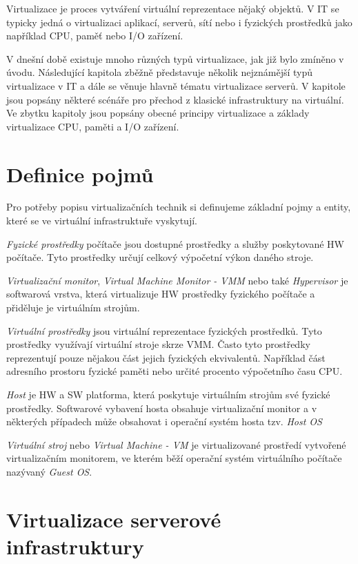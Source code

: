 Virtualizace je proces vytváření virtuální reprezentace nějaký objektů. V IT se typicky jedná o virtualizaci aplikací, serverů, sítí nebo i fyzických prostředků jako například CPU, paměť nebo I/O zařízení.

V dnešní době existuje mnoho různých typů virtualizace, jak již bylo zmíněno v úvodu. Následující kapitola zběžně představuje několik nejznámější typů virtualizace v IT a dále se věnuje hlavně
tématu virtualizace serverů. V kapitole jsou popsány některé scénáře pro přechod z klasické infrastruktury na virtuální. Ve zbytku kapitoly jsou popsány obecné principy virtualizace a základy 
virtualizace CPU, paměti a I/O zařízení.

\section{Definice pojmů}
\label{definitions}

Pro potřeby popisu virtualizačních technik si definujeme základní pojmy a entity, které se ve virtuální infrastruktuře vyskytují.

\textit{Fyzické prostředky} počítače jsou dostupné prostředky a služby poskytované HW počítače. Tyto prostředky určují celkový výpočetní výkon daného stroje.

\textit{Virtualizační monitor}, \textit{Virtual Machine Monitor - VMM} nebo také \textit{Hypervisor} je softwarová vrstva, která virtualizuje HW prostředky fyzického počítače a přiděluje je
virtuálním strojům.

\textit{Virtuální prostředky} jsou virtuální reprezentace fyzických prostředků. Tyto prostředky využívají virtuální stroje skrze VMM. Často tyto prostředky reprezentují pouze nějakou část jejich fyzických ekvivalentů. Například 
část adresního prostoru fyzické paměti nebo určité procento výpočetního času CPU.

\textit{Host} je HW a SW platforma, která poskytuje virtuálním strojům své fyzické prostředky. Softwarové vybavení hosta obsahuje virtualizační
monitor a v některých případech může obsahovat i operační systém hosta tzv. \textit{Host OS}

\textit{Virtuální stroj} nebo \textit{Virtual Machine - VM} je virtualizované prostředí vytvořené virtualizačním monitorem, ve kterém běží operační systém virtuálního počítače nazývaný \textit{Guest OS}.

\section{Virtualizace serverové infrastruktury}


